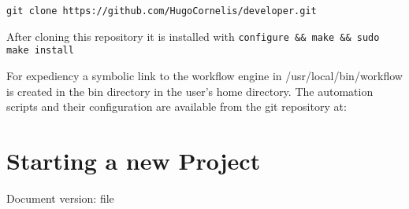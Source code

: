\documentclass[a4paper,openbib,10pt]{article}
\begin{document}
\begin{verbatim}
git clone https://github.com/HugoCornelis/developer.git
\end{verbatim}

After cloning this repository it is installed with {\tt configure \&\&
  make \&\& sudo make install}

For expediency a symbolic link to the workflow engine in /usr/local/bin/workflow is created in the bin directory in the user’s home directory.
The automation scripts and their configuration are available from the git repository at:

\section{Starting a new Project}








% 

% 


{\small Document version: \pdfmdfivesum file {\jobname}}
\end{document}
